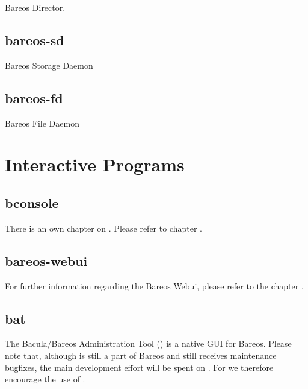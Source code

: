 Bareos Director.

\subsection{bareos-sd}
\label{command-bareos-sd}

Bareos Storage Daemon


\subsection{bareos-fd}
\label{command-bareos-fd}

Bareos File Daemon


\section{Interactive Programs}

\subsection{bconsole}

There is an own chapter on .
Please refer to chapter .

\subsection{bareos-webui}

For further information regarding the Bareos Webui, please refer to the chapter .

\subsection{bat}
\label{bat}

The Bacula/Bareos Administration Tool () is a native GUI for Bareos. Please note that, although  is still a part of Bareos and still receives maintenance bugfixes, the main development effort will be spent on \bareosWebui. For  we therefore encourage the use of \bareosWebui.


